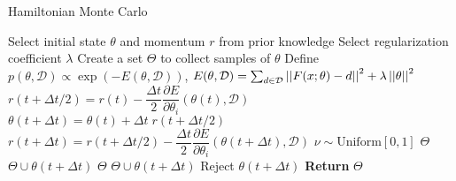 \begin{enumerate}
\begin{algorithm}[tb]
    \centering
    \caption{Hamiltonian Monte Carlo}\label{algo:hmc}
    \begin{algorithmic}[1]
      \State Select initial state $\theta$ and momentum $r$ from prior knowledge
      \State Select regularization coefficient $\lambda$
      \State Create a set $\Theta$ to collect samples of $\theta$
      \State Define $p(\theta, \mathcal{D}) \propto \exp(-E(\theta, \mathcal{D}))$, \; $E(\theta, \mathcal{D}) = \sum_{d \in \mathcal{D}}\left|\left|F(x;\theta) - d\right|\right|^2 + \lambda \left|\left|\theta\right|\right|^2$
      \State $r(t + \Delta t/2) = r(t) - \dfrac{\Delta t}{2} \dfrac{\partial E}{\partial \theta_i}(\theta(t), \mathcal{D})$
      \State $\theta(t + \Delta t) = \theta(t) + \Delta t \; r(t + \Delta t/2) $ 
      \State $r(t + \Delta t) = r(t + \Delta t/2) - \dfrac{\Delta t}{2}\dfrac{\partial E}{\partial \theta_i}(\theta(t + \Delta t), \mathcal{D})$
      \State $\nu \sim \text{Uniform}[0, 1]$
      \State $\Theta$ \leftarrow \; $\Theta \cup \theta(t + \Delta t)$ 
      \State $\Theta$ \leftarrow \; $\Theta \cup \theta(t + \Delta t)$ 
      \State Reject $\theta(t + \Delta t)$ 
      \EndIf
      \EndFor
      \State \textbf{Return} $\Theta$
    \end{algorithmic}
\end{algorithm}


\end{enumerate}
